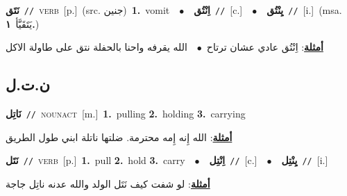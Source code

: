 \documentclass[10pt,a4paper,twoside]{article} %
\begin{document}
\begin{multicols}{2}
{\setlength\topsep{0pt}\textbf{\foreignlanguage{arabic}{نَتَق}}\ {\color{gray}\texttt{//}\color{black}}\ \textsc{verb}\ [p.]\ (src. \color{gray}\foreignlanguage{arabic}{جنين}\color{black})\ \textbf{1.}~vomit\ \ $\bullet$\ \ \setlength\topsep{0pt}\textbf{\foreignlanguage{arabic}{اِنْتُق}}\ {\color{gray}\texttt{//}\color{black}}\ [c.]\ \ $\bullet$\ \ \setlength\topsep{0pt}\textbf{\foreignlanguage{arabic}{يِنْتُق}}\ {\color{gray}\texttt{//}\color{black}}\ [i.]\ \color{gray}(msa. \foreignlanguage{arabic}{يَتَقَيَّأ}~\foreignlanguage{arabic}{\textbf{١.}})\color{black}\  \begin{flushright}\color{gray}\foreignlanguage{arabic}{\textbf{\underline{\foreignlanguage{arabic}{أمثلة}}}: اِنْتُق عادي عشان ترتاح\ $\bullet$\ \  الله يقرفه واحنا بالحفلة نتق على طاولة الاكل}\end{flushright}\color{black}} \vspace{2mm}

\vspace{-3mm}
\subsection*{\color{blue}\foreignlanguage{arabic}{ن.ت.ل}\color{blue}{}} 

{\setlength\topsep{0pt}\textbf{\foreignlanguage{arabic}{نَاتِل}}\ {\color{gray}\texttt{//}\color{black}}\ \textsc{noun\textunderscore act}\ [m.]\ \textbf{1.}~pulling  \textbf{2.}~holding  \textbf{3.}~carrying\  \begin{flushright}\color{gray}\foreignlanguage{arabic}{\textbf{\underline{\foreignlanguage{arabic}{أمثلة}}}: الله إِنه إِمه محترمة. ضلتها ناتلة ابني طول الطريق}\end{flushright}\color{black}} \vspace{2mm}

{\setlength\topsep{0pt}\textbf{\foreignlanguage{arabic}{نَتَل}}\ {\color{gray}\texttt{//}\color{black}}\ \textsc{verb}\ [p.]\ \textbf{1.}~pull  \textbf{2.}~hold  \textbf{3.}~carry\ \ $\bullet$\ \ \setlength\topsep{0pt}\textbf{\foreignlanguage{arabic}{اِنْتِل}}\ {\color{gray}\texttt{//}\color{black}}\ [c.]\ \ $\bullet$\ \ \setlength\topsep{0pt}\textbf{\foreignlanguage{arabic}{يِنْتِل}}\ {\color{gray}\texttt{//}\color{black}}\ [i.]\  \begin{flushright}\color{gray}\foreignlanguage{arabic}{\textbf{\underline{\foreignlanguage{arabic}{أمثلة}}}: لو شفت كيف نَتَل الولد والله عدنه ناتِل جاجة}\end{flushright}\color{black}} \vspace{2mm}


\end{multicols}
\end{document}
